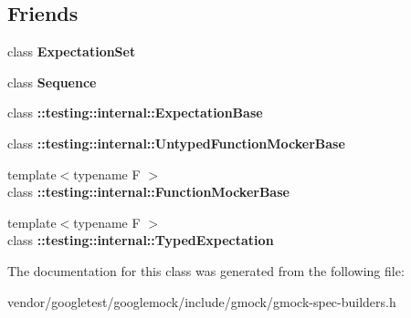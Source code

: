 \subsection*{Friends}
\begin{DoxyCompactItemize}
\item 
class {\bfseries Expectation\+Set}\hypertarget{classtesting_1_1Expectation_acf5c2877a449d4ad1889ee5833ebb193}{}\label{classtesting_1_1Expectation_acf5c2877a449d4ad1889ee5833ebb193}

\item 
class {\bfseries Sequence}\hypertarget{classtesting_1_1Expectation_a26271d5afaff6e6d3f00c055c63d0b24}{}\label{classtesting_1_1Expectation_a26271d5afaff6e6d3f00c055c63d0b24}

\item 
class {\bfseries \+::testing\+::internal\+::\+Expectation\+Base}\hypertarget{classtesting_1_1Expectation_a9a45d4d807ed262ab76ab842b8d33761}{}\label{classtesting_1_1Expectation_a9a45d4d807ed262ab76ab842b8d33761}

\item 
class {\bfseries \+::testing\+::internal\+::\+Untyped\+Function\+Mocker\+Base}\hypertarget{classtesting_1_1Expectation_a709c2d6bee1223cfbcadc58e884cdb4b}{}\label{classtesting_1_1Expectation_a709c2d6bee1223cfbcadc58e884cdb4b}

\item 
{\footnotesize template$<$typename F $>$ }\\class {\bfseries \+::testing\+::internal\+::\+Function\+Mocker\+Base}\hypertarget{classtesting_1_1Expectation_a92066c162835b0d3d2317c9643a87e7e}{}\label{classtesting_1_1Expectation_a92066c162835b0d3d2317c9643a87e7e}

\item 
{\footnotesize template$<$typename F $>$ }\\class {\bfseries \+::testing\+::internal\+::\+Typed\+Expectation}\hypertarget{classtesting_1_1Expectation_a86c4872d3edbede5e8ac148525bc8893}{}\label{classtesting_1_1Expectation_a86c4872d3edbede5e8ac148525bc8893}

\end{DoxyCompactItemize}


The documentation for this class was generated from the following file\+:\begin{DoxyCompactItemize}
\item 
vendor/googletest/googlemock/include/gmock/gmock-\/spec-\/builders.\+h\end{DoxyCompactItemize}
